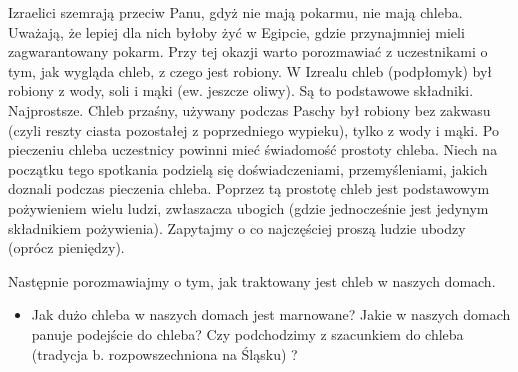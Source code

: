 \documentclass[a5paper,10pt,polish]{book}
\begin{document}
Izraelici szemrają przeciw Panu, gdyż nie mają pokarmu, nie mają chleba. Uważają, że lepiej dla nich byłoby żyć w Egipcie, gdzie przynajmniej mieli zagwarantowany pokarm. Przy tej okazji
warto porozmawiać z uczestnikami o tym, jak wygląda chleb, z czego jest robiony. W Izrealu chleb (podpłomyk) był robiony z wody, soli i mąki (ew. jeszcze oliwy). Są to podstawowe składniki. Najprostsze. Chleb przaśny, używany podczas Paschy był robiony bez zakwasu (czyli reszty ciasta pozostałej z poprzedniego wypieku), tylko z wody i mąki. Po pieczeniu chleba uczestnicy powinni mieć świadomość prostoty chleba. Niech na początku tego spotkania podzielą się doświadczeniami, przemyśleniami, jakich doznali podczas pieczenia chleba. Poprzez tą prostotę chleb jest podstawowym pożywieniem wielu ludzi, zwłaszacza ubogich (gdzie jednocześnie jest jedynym składnikiem pożywienia). Zapytajmy o co najczęściej proszą ludzie ubodzy (oprócz pieniędzy).

Następnie porozmawiajmy o tym, jak traktowany jest chleb w naszych domach.
\begin{itemize}
\item {} 
Jak dużo chleba w naszych domach jest marnowane? Jakie w naszych domach panuje podejście do chleba? Czy podchodzimy z szacunkiem do chleba (tradycja b. rozpowszechniona na Śląsku) ?

\end{itemize}
\end{document}
